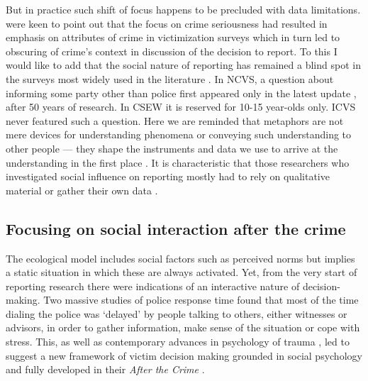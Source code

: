 \documentclass[]{interact}
\theoremstyle{plain}%
\theoremstyle{definition}
\theoremstyle{remark}
\newcommand\citep{\parencite}
\newcommand\citet{\textcite}
\begin{document}
	But in practice such shift of focus happens to be precluded with data limitations. \citet{goudriaan2004reporting} were keen to point out that the focus on crime seriousness had resulted in emphasis on attributes of crime in victimization surveys which in turn led to obscuring of crime's context in discussion of the decision to report. To this I would like to add that the social nature of reporting has remained a blind spot in the surveys most widely used in the literature \citep{xie2019crime}. In NCVS, a question about informing some party other than police first appeared only in the latest update \citep{bjs@redesign}, after 50 years of research. In CSEW it is reserved for 10-15 year-olds only. ICVS never featured such a question. Here we are reminded that metaphors are not mere devices for understanding phenomena or conveying such understanding to other people --- they shape the instruments and data we use to arrive at the understanding in the first place \citep{feyerabend1975against}. It is characteristic that those researchers who investigated social influence on reporting mostly had to rely on qualitative material \citep{campbell2015pathways, dworkin2018correlates, brooks2020doing} or gather their own data \citep{greenberg1992after, greenberg2004property, baert2024factors, mason1996effect, knoth2019reporting}.
	
	\subsection*{Focusing on social interaction after the crime}
	\label{sec:focusing}
		
	The ecological model includes social factors such as perceived norms but implies a static situation in which these are always activated. Yet, from the very start of reporting research there were indications of an interactive nature of decision-making. Two massive studies of police response time \citep{van1978response, spelman1985calling} found that most of the time dialing the police was `delayed' by people talking to others, either witnesses or advisors, in order to gather information, make sense of the situation or cope with stress. This, as well as contemporary advances in psychology of trauma \citep{wortman1979interpersonal, kunreuther1978disaster, figley1985trauma, perloff1983perceptions, bard1980things}, led \citet{ruback1984social} to suggest a new framework of victim decision making grounded in social psychology and fully developed in their \textit{After the Crime} \citep{greenberg1992after}.%
	
\end{document}
